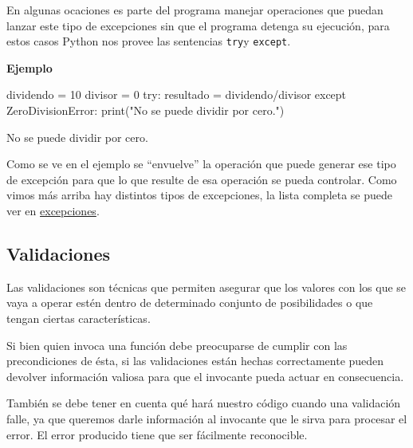 \documentclass[
  letterpaper,
  DIV=11,
  numbers=noendperiod]{scrreprt}
\newenvironment{Shaded}{\begin{snugshade}}{\end{snugshade}}
\newcommand{\BuiltInTok}[1]{\textcolor[rgb]{0.00,0.23,0.31}{#1}}
\newcommand{\ControlFlowTok}[1]{\textcolor[rgb]{0.00,0.23,0.31}{#1}}
\newcommand{\DecValTok}[1]{\textcolor[rgb]{0.68,0.00,0.00}{#1}}
\newcommand{\ExtensionTok}[1]{\textcolor[rgb]{0.00,0.23,0.31}{#1}}
\newcommand{\NormalTok}[1]{\textcolor[rgb]{0.00,0.23,0.31}{#1}}
\newcommand{\OperatorTok}[1]{\textcolor[rgb]{0.37,0.37,0.37}{#1}}
\newcommand{\PreprocessorTok}[1]{\textcolor[rgb]{0.68,0.00,0.00}{#1}}
\newcommand{\StringTok}[1]{\textcolor[rgb]{0.13,0.47,0.30}{#1}}
\begin{document}
En algunas ocaciones es parte del programa manejar operaciones que
puedan lanzar este tipo de excepciones sin que el programa detenga su
ejecución, para estos casos Python nos provee las sentencias
\texttt{try}y \texttt{except}.

\textbf{Ejemplo}

\begin{Shaded}
\begin{Highlighting}[]
\NormalTok{dividendo }\OperatorTok{=} \DecValTok{10}
\NormalTok{divisor }\OperatorTok{=} \DecValTok{0}
\ControlFlowTok{try}\NormalTok{:}
\NormalTok{  resultado }\OperatorTok{=}\NormalTok{ dividendo}\OperatorTok{/}\NormalTok{divisor }
\ControlFlowTok{except} \PreprocessorTok{ZeroDivisionError}\NormalTok{:}
  \BuiltInTok{print}\NormalTok{(}\StringTok{"No se puede dividir por cero."}\NormalTok{)}
\end{Highlighting}
\end{Shaded}

\begin{Shaded}
\begin{Highlighting}[]
\ExtensionTok{No}\NormalTok{ se puede dividir por cero.}
\end{Highlighting}
\end{Shaded}

Como se ve en el ejemplo se ``envuelve'' la operación que puede generar
ese tipo de excepción para que lo que resulte de esa operación se pueda
controlar. Como vimos más arriba hay distintos tipos de excepciones, la
lista completa se puede ver en
\href{https://docs.python.org/es/3/library/exceptions.html\#base-classes}{excepciones}.

\subsection{Validaciones}\label{validaciones}

Las validaciones son técnicas que permiten asegurar que los valores con
los que se vaya a operar estén dentro de determinado conjunto de
posibilidades o que tengan ciertas características.

Si bien quien invoca una función debe preocuparse de cumplir con las
precondiciones de ésta, si las validaciones están hechas correctamente
pueden devolver información valiosa para que el invocante pueda actuar
en consecuencia.

También se debe tener en cuenta qué hará nuestro código cuando una
validación falle, ya que queremos darle información al invocante que le
sirva para procesar el error. El error producido tiene que ser
fácilmente reconocible.
\end{document}
